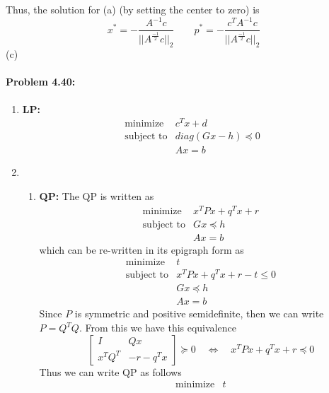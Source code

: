 \documentclass[12pt] {article}
\begin{document}
Thus, the solution for (a) (by setting the center to zero) is 
$$
x^{*} = - \frac{A^{-1}c}{||A^{\frac{-1}{2}}c ||_{2}} \quad \quad p^{*}= - \frac{c^{T}A^{-1}c}{||A^{\frac{-1}{2}}c ||_{2}}
$$
(c)
\paragraph{Problem 4.40:} 
\begin{enumerate}
\item  \textbf{LP:}
\[
\begin{array}{cl}
\text{minimize} & c^{T}x +d\\
\text{subject to} & diag(Gx - h) \preceq 0\\
&Ax = b
\end{array} 
\]
\item 
\begin{enumerate}
\item \textbf{QP:} The QP is written as 
\[
\begin{array}{cl}
\text{minimize} & x^{T}Px+q^{T}x+r\\
\text{subject to} & Gx \preceq h\\
&Ax = b
\end{array} 
\]
which can be re-written in its epigraph form as 
\[
\begin{array}{cl}
\text{minimize} & t\\
\text{subject to} & x^{T}Px + q^{T}x + r - t \leq 0 \\
& Gx \preceq h\\
&Ax = b
\end{array} 
\]
Since $P$ is symmetric and positive semidefinite, then we can write $P=Q^{T}Q$. From this we have this equivalence  
\[
\left[
\begin{array}{cc}
I & Qx \\
x^{T}Q^{T} & -r-q^{T}x
\end{array} 
\right]
\succeq 0 
\quad \Longleftrightarrow  \quad 
x^{T}Px + q^{T}x + r \preceq 0 
\]
Thus we can write QP as follows 
\[
\begin{array}{cl}
\text{minimize} & t\\


\end{array}\]
\end{enumerate}
\end{enumerate}
\end{document}

